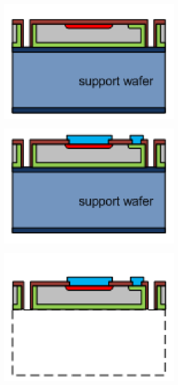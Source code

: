 \begin{figure}[htbp]
  \begin{subfigure}[b]{0.3\textwidth}
    \centering
    \includegraphics[width=\textwidth]{figures/ActiveEdge/advacamProcess/wafer_7.pdf}
    \caption{}
  \end{subfigure}\hfill
  \begin{subfigure}[b]{0.3\textwidth}
    \includegraphics[width=\textwidth]{figures/ActiveEdge/advacamProcess/wafer_8.pdf}
    \caption{}
  \end{subfigure}\hfill
  \begin{subfigure}[b]{0.3\textwidth}
    \includegraphics[width=\textwidth]{figures/ActiveEdge/advacamProcess/wafer_9.pdf}

\end{subfigure}
\end{figure}
